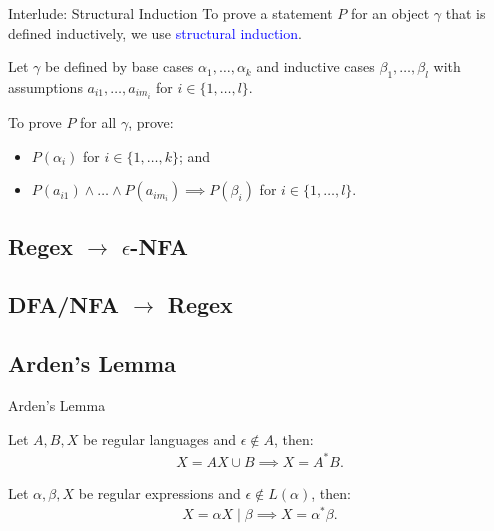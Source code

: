 \documentclass{beamer}
\def\padding{\vspace{0.5cm}}
\def\b{\textcolor{blue}}
\begin{document}
\begin{frame}{Interlude: Structural Induction}
    To prove a statement $P$ for an object $\gamma$ that is defined inductively, we use \b{structural induction}.\pause\padding

    Let $\gamma$ be defined by base cases $\alpha_1, \dots, \alpha_k$ and inductive cases $\beta_1, \dots, \beta_l$ with assumptions $a_{i1}, \dots, a_{im_i}$ for $i \in \{1, \dots, l\}$.\pause\padding

    To prove $P$ for all $\gamma$, prove:
    \begin{itemize}
        \item $P(\alpha_i)$ for $i \in \{1, \dots, k\}$\pause; and
        \item $P(a_{i1}) \land \dots \land P(a_{im_i}) \implies P(\beta_i)$ for $i \in \{1, \dots, l\}$.
    \end{itemize}
\end{frame}

\subsection{Regex $\to$ $\epsilon$-NFA}

\subsection{DFA/NFA $\to$ Regex}

\subsection{Arden's Lemma}

\begin{frame}{Arden's Lemma}
    \begin{theorem}
        Let $A, B, X$ be regular languages and $\epsilon \not\in A$, then:
        \begin{align*}
            X = AX \cup B \implies X = A^* B.
        \end{align*}
    \end{theorem}\pause
    \begin{theorem}
        Let $\alpha, \beta, X$ be regular expressions and $\epsilon \not\in L(\alpha)$, then:
        \begin{align*}
            X = \alpha X \mid \beta \implies X = \alpha^* \beta.
        \end{align*}
    \end{theorem}
\end{frame}
\end{document}
